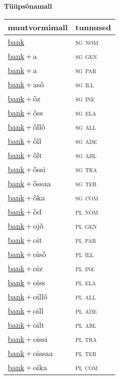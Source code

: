 
\vspace{1.8em}
\begin{minipage}{\textwidth}
\textbf{Tüüpsõnamall \,}\\

\begin{sideways}
\begin{tabular}{l l}
muutvormimall & tunnused \\
\hline
\underline{bank} & \textsc{ sg nom } \\
\underline{bank}\,+\,a & \textsc{ sg gen } \\
\underline{bank}\,+\,a & \textsc{ sg par } \\
\underline{bank}\,+\,asõ & \textsc{ sg ill } \\
\underline{bank}\,+\,õz & \textsc{ sg ine } \\
\underline{bank}\,+\,õss & \textsc{ sg ela } \\
\underline{bank}\,+\,õllõ & \textsc{ sg all } \\
\underline{bank}\,+\,õll & \textsc{ sg ade } \\
\underline{bank}\,+\,õlt & \textsc{ sg abl } \\
\underline{bank}\,+\,õssi & \textsc{ sg tra } \\
\underline{bank}\,+\,õssaa & \textsc{ sg ter } \\
\underline{bank}\,+\,õka & \textsc{ sg com } \\
\underline{bank}\,+\,õd & \textsc{ pl nom } \\
\underline{bank}\,+\,ojõ & \textsc{ pl gen } \\
\underline{bank}\,+\,oit & \textsc{ pl par } \\
\underline{bank}\,+\,oisõ & \textsc{ pl ill } \\
\underline{bank}\,+\,oiz & \textsc{ pl ine } \\
\underline{bank}\,+\,oiss & \textsc{ pl ela } \\
\underline{bank}\,+\,oillõ & \textsc{ pl all } \\
\underline{bank}\,+\,oill & \textsc{ pl ade } \\
\underline{bank}\,+\,oilt & \textsc{ pl abl } \\
\underline{bank}\,+\,oissi & \textsc{ pl tra } \\
\underline{bank}\,+\,oissaa & \textsc{ pl ter } \\
\underline{bank}\,+\,oika & \textsc{ pl com } \\
\end{tabular}
\end{sideways}
\label{tab:tüüpsõnamall-bank}

\end{minipage}

